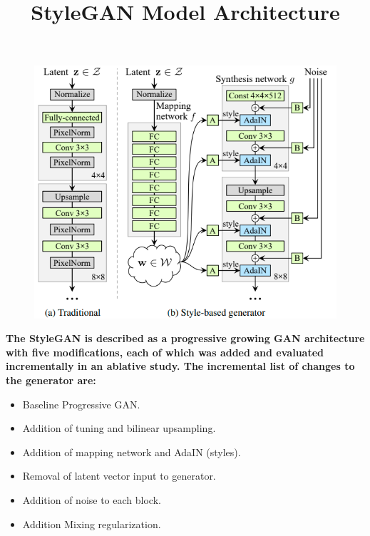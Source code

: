 \begin{frame}
    \title{StyleGAN Model Architecture}
	\begin{figure}[h!]
		\includegraphics[scale=0.40]{images/StyleGan_Architecture.png}
	\end{figure}
    \textbf{The StyleGAN is described as a progressive growing GAN architecture with five modifications, each of which was added and evaluated incrementally in an ablative study.
    The incremental list of changes to the generator are:}
    \begin{itemize}
        \item Baseline Progressive GAN.
        \item Addition of tuning and bilinear upsampling.
        \item Addition of mapping network and AdaIN (styles).
        \item Removal of latent vector input to generator.
        \item Addition of noise to each block.
        \item Addition Mixing regularization.
    \end{itemize}

\end{frame}

